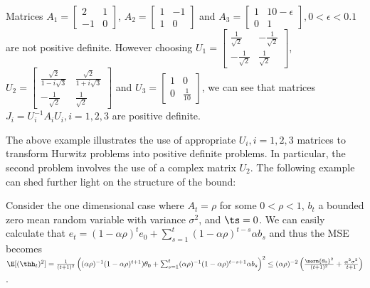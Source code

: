 \begin{example}\label{ex:pdas}
Matrices $A_1=\begin{bmatrix} 2 &1 \\-1 &0\end{bmatrix}$,
$A_2=\begin{bmatrix}1 & -1\\ 1 &0 \end{bmatrix}$ and $A_3=\begin{bmatrix} 1 & 10-\epsilon \\ 0 &1 \end{bmatrix},0<\epsilon<0.1$ are not positive definite. However choosing $U_1=\begin{bmatrix} \frac{1}{\sqrt{2}}& -\frac{1}{\sqrt{2}}\\ -\frac{1}{\sqrt{2}} &\frac{1}{\sqrt{2}} \end{bmatrix}$, $U_2=\begin{bmatrix} \frac{\sqrt{2}}{1-i\sqrt{3}} & \frac{\sqrt{2}}{1+i\sqrt{3}} \\ -\frac{1}{\sqrt{2}} &\frac{1}{\sqrt{2}}\end{bmatrix}$ and $U_3=\begin{bmatrix} 1 & 0\\ 0 &\frac{1}{10} \end{bmatrix}$, we can see that matrices $J_i=U_i^{-1}A_i U_i,i=1,2,3$ are positive definite.
\end{example}
The above example  illustrates the use of appropriate $U_i,i=1,2,3$ matrices to transform Hurwitz problems into positive definite problems. In particular, the second problem involves the use of a complex matrix $U_2$.
\fi
{}
The following example can shed further light on the structure of the bound:%
\begin{example}\label{ex:geo}
Consider the one dimensional case where $A_t=\rho$ for some $0<\rho<1$, $b_t$ a bounded \iid zero mean random variable with variance $\sigma^2$, and $\ts=0$. We can easily calculate 
that $e_t=(1-\alpha\rho)^t e_0+\sum_{s=1}^t (1-\alpha \rho)^{t-s}\alpha b_s$ and thus the MSE becomes 
$%
\E[(\thh_t)^2]=\frac{1}{(t+1)^2}\left( (\alpha\rho)^{-1}(1-\alpha\rho)^{t+1}) \theta_0+ \sum_{s=1}^t (\alpha\rho)^{-1}(1-\alpha \rho)^{t-s+1} \alpha b_s\right)^2
\leq (\alpha\rho)^{-2}\left(\frac{\norm{\theta_0}^2}{(t+1)^2}+\frac{\alpha^2\sigma^2}{t+1}\right)
$.
\end{example}
